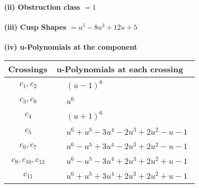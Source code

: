 \documentclass[1p]{elsarticle_modified}
\theoremstyle{definition}
\begin{document}
\flushleft \textbf{(ii) Obstruction class $= 1$}\\~\\
\flushleft \textbf{(iii) Cusp Shapes $= u^5-8 u^3+12 u+5$}\\~\\
\newpage\renewcommand{\arraystretch}{1}
\flushleft \textbf{(iv) u-Polynomials at the component}\newline \\
\begin{tabular}{m{50pt}|m{274pt}}
Crossings & \hspace{64pt}u-Polynomials at each crossing \\
\hline $$\begin{aligned}c_{1},c_{2}\end{aligned}$$&$\begin{aligned}
&(u-1)^6
\end{aligned}$\\
\hline $$\begin{aligned}c_{3},c_{8}\end{aligned}$$&$\begin{aligned}
&u^6
\end{aligned}$\\
\hline $$\begin{aligned}c_{4}\end{aligned}$$&$\begin{aligned}
&(u+1)^6
\end{aligned}$\\
\hline $$\begin{aligned}c_{5}\end{aligned}$$&$\begin{aligned}
&u^6+u^5-3 u^4-2 u^3+2 u^2- u-1
\end{aligned}$\\
\hline $$\begin{aligned}c_{6},c_{7}\end{aligned}$$&$\begin{aligned}
&u^6- u^5+3 u^4-2 u^3+2 u^2- u-1
\end{aligned}$\\
\hline $$\begin{aligned}c_{9},c_{10},c_{12}\end{aligned}$$&$\begin{aligned}
&u^6- u^5-3 u^4+2 u^3+2 u^2+u-1
\end{aligned}$\\
\hline $$\begin{aligned}c_{11}\end{aligned}$$&$\begin{aligned}
&u^6+u^5+3 u^4+2 u^3+2 u^2+u-1
\end{aligned}$\\
\hline
\end{tabular}\\~\\
\end{document}
